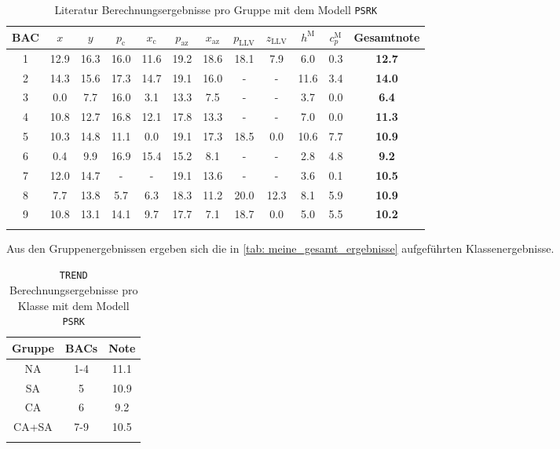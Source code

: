 \documentclass[../thesis.tex]{subfiles}
\begin{document}
\begin{table} [htb]
	\centering
	\caption{Literatur Berechnungsergebnisse pro Gruppe mit dem Modell \texttt{PSRK}}
	\begin{tabular}{ cccccccccccc }
		\hline
		BAC & $ x $ & $ y $ & $ p_\mathrm{c}$ & $ x_\mathrm{c}$ & $ p_\mathrm{az}$ & $ x_\mathrm{az}$ & $ p_\mathrm{LLV}$ & $ z_\mathrm{LLV}$ & $ h^\mathrm{M} $ & $ c_p^\mathrm{M} $ & \textbf{Gesamtnote} \\
		\hline
		1 & 12.9 & 16.3 & 16.0  & 11.6  & 19.2  & 18.6 & 18.1 & 7.9  & 6.0  & 0.3 & \textbf{12.7}\\
		2 & 14.3 & 15.6 & 17.3  & 14.7  & 19.1  & 16.0 & -    & -    & 11.6 & 3.4 & \textbf{14.0}\\
		3 & 0.0  & 7.7  & 16.0  & 3.1   & 13.3  & 7.5  & -    & -    & 3.7  & 0.0 & \textbf{6.4}\\
		4 & 10.8 & 12.7 & 16.8  & 12.1  & 17.8  & 13.3 & -    & -    & 7.0  & 0.0 & \textbf{11.3}\\
		5 & 10.3 & 14.8 & 11.1  & 0.0   & 19.1  & 17.3 & 18.5 & 0.0  & 10.6 & 7.7 & \textbf{10.9}\\
		6 & 0.4  & 9.9  & 16.9  & 15.4  & 15.2  & 8.1  & -    & -    & 2.8  & 4.8 & \textbf{9.2}\\
		7 & 12.0 & 14.7 & -     & -     & 19.1  & 13.6 & -    & -    & 3.6  & 0.1 & \textbf{10.5}\\
		8 & 7.7  & 13.8 & 5.7   & 6.3   & 18.3  & 11.2 & 20.0 & 12.3 & 8.1  & 5.9 & \textbf{10.9}\\
		9 & 10.8 & 13.1 & 14.1  & 9.7   & 17.7  & 7.1  & 18.7 & 0.0  & 5.0  & 5.5 & \textbf{10.2}\\
		\hline
		\label{tab: PSRK benchmark literatur bac}
	\end{tabular}
\end{table}

Aus den Gruppenergebnissen ergeben sich die in \autoref{tab: meine_gesamt_ergebnisse} aufgeführten Klassenergebnisse.

\begin{table} [htb]
	\centering
	\caption{\texttt{TREND} Berechnungsergebnisse pro Klasse mit dem Modell \texttt{PSRK}}
	\begin{tabular}{ ccc }
		\hline
		Gruppe & BACs & Note  \\
		\hline
		NA & 1-4 & 11.1 \\
		SA & 5   & 10.9 \\
		CA & 6   & 9.2 \\
		CA+SA & 7-9 & 10.5 \\ 
		\hline
		\label{tab: PSRK benchmark literatur gruppen}
	\end{tabular}
\end{table}
\end{document}

